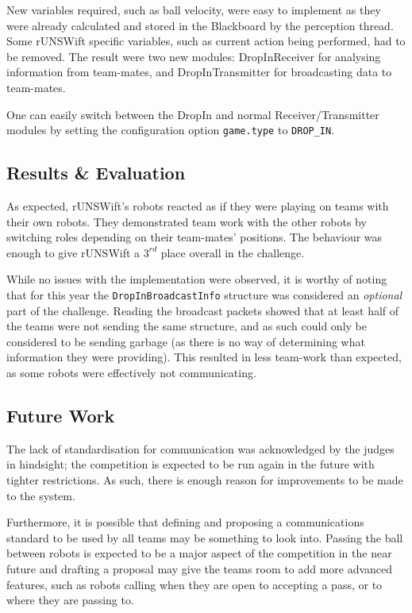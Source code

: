 New variables required, such as ball velocity, were easy to implement as they were already calculated and stored in the Blackboard by the perception thread. Some rUNSWift specific variables, such as current action being performed, had to be removed. The result were two new modules: DropInReceiver for analysing information from team-mates, and DropInTransmitter for broadcasting data to team-mates.

One can easily switch between the DropIn and normal Receiver/Transmitter modules by setting the configuration option \texttt{game.type} to \texttt{DROP\_IN}.

\subsection{Results \& Evaluation}

As expected, rUNSWift's robots reacted as if they were playing on teams with their own robots. They demonstrated team work with the other robots by switching roles depending on their team-mates' positions. The behaviour was enough to give rUNSWift a $3^{rd}$ place overall in the challenge.

While no issues with the implementation were observed, it is worthy of noting that for this year the \texttt{DropInBroadcastInfo} structure was considered an \textit{optional} part of the challenge. Reading the broadcast packets showed that at least half of the teams were not sending the same structure, and as such could only be considered to be sending garbage (as there is no way of determining what information they were providing). This resulted in less team-work than expected, as some robots were effectively not communicating. 

\subsection{Future Work}

The lack of standardisation for communication was acknowledged by the judges in hindsight; the competition is expected to be run again in the future with tighter restrictions. As such, there is enough reason for improvements to be made to the system.

Furthermore, it is possible that defining and proposing a communications standard to be used by all teams may be something to look into. Passing the ball between robots is expected to be a major aspect of the competition in the near future and drafting a proposal may give the teams room to add more advanced features, such as robots calling when they are open to accepting a pass, or to where they are passing to.

